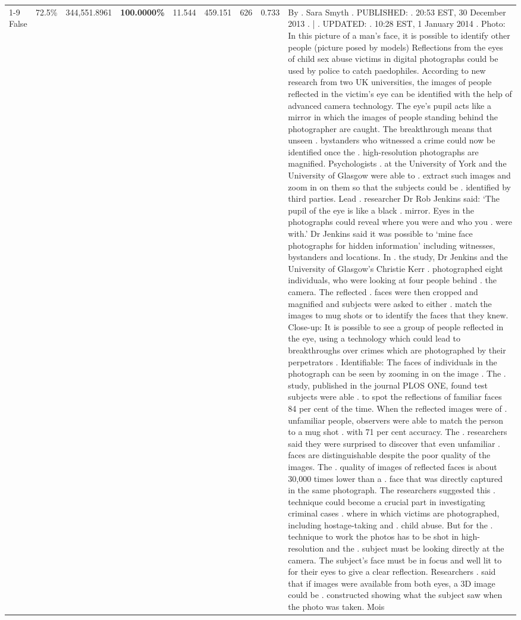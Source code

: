 \begin{table}[H]
\begin{tabular}{lllrlllll}
\cline{1-9}
False & 72.5\% & 344,551.8961 & \bfseries \color{red} 100.0000\% & 11.544 & 459.151 & 626 & 0.733 & By . Sara Smyth . PUBLISHED: . 20:53 EST, 30 December 2013 . | . UPDATED: . 10:28 EST, 1 January 2014 . Photo: In this picture of a man's face, it is possible to identify other people (picture posed by models) Reflections from the eyes of child sex abuse victims in digital photographs could be used by police to catch paedophiles. According to new research from two UK universities, the images of people reflected in the victim's eye can be identified with the help of advanced camera technology. The eye's pupil acts like a mirror in which the images of people standing behind the photographer are caught. The breakthrough means that unseen . bystanders who witnessed a crime could now be identified once the . high-resolution photographs are magnified. Psychologists . at the University of York and the University of Glasgow were able to . extract such images and zoom in on them so that the subjects could be . identified by third parties. Lead . researcher Dr Rob Jenkins said: ‘The pupil of the eye is like a black . mirror. Eyes in the photographs could reveal where you were and who you . were with.' Dr Jenkins said it was possible to ‘mine face photographs for hidden information' including witnesses, bystanders and locations. In . the study, Dr Jenkins and the University of Glasgow's Christie Kerr . photographed eight individuals, who were looking at four people behind . the camera. The reflected . faces were then cropped and magnified and subjects were asked to either . match the images to mug shots or to identify the faces that they knew. Close-up: It is possible to see a group of people reflected in the eye, using a technology which could lead to breakthroughs over crimes which are photographed by their perpetrators . Identifiable: The faces of individuals in the photograph can be seen by zooming in on the image . The . study, published in the journal PLOS ONE, found test subjects were able . to spot the reflections of familiar faces 84 per cent of the time. When the reflected images were of . unfamiliar people, observers were able to match the person to a mug shot . with 71 per cent accuracy. The . researchers said they were surprised to discover that even unfamiliar . faces are distinguishable despite the poor quality of the images. The . quality of images of reflected faces is about 30,000 times lower than a . face that was directly captured in the same photograph. The researchers suggested this . technique could become a crucial part in investigating criminal cases . where in which victims are photographed, including hostage-taking and . child abuse. But for the . technique to work the photos has to be shot in high-resolution and the . subject must be looking directly at the camera. The subject's face must be in focus and well lit to for their eyes to give a clear reflection. Researchers . said that if images were available from both eyes, a 3D image could be . constructed showing what the subject saw when the photo was taken. Mois \\

\end{tabular}
\end{table}
